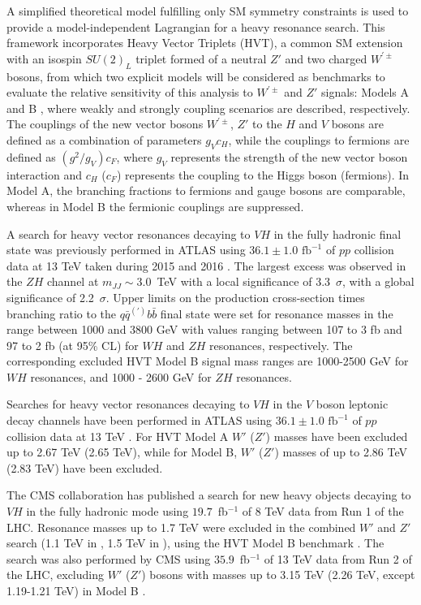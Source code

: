 A simplified theoretical model \cite{Pappadopulo:2014qza} fulfilling only SM symmetry constraints is used to provide a model-independent Lagrangian for a heavy resonance search.
This framework incorporates Heavy Vector Triplets (HVT), a common SM extension with an isospin $SU(2)_{L}$ triplet formed of a neutral $Z'$ and two charged $W^{\prime \pm}$ bosons, from which two explicit models will be considered as benchmarks to evaluate the relative sensitivity of this analysis to $W^{\prime \pm}$ and $Z'$ signals: Models A and B \cite{Pappadopulo:2014qza}, where weakly and strongly coupling scenarios are described, respectively.
The couplings of the new vector bosons $W^{\prime \pm}$, $Z'$ to the $H$ and $V$ bosons are defined as a combination of parameters $g_{V}c_{H}$, while the couplings to fermions are defined as $(g^{2}/g_{V})c_{F}$, where $g_V$ represents the strength of the new vector boson interaction and $c_{H}$ ($c_{F}$) represents the coupling to the Higgs boson (fermions).
In Model A, the branching fractions to fermions and gauge bosons are comparable, whereas in Model B the fermionic couplings are suppressed.

A search for heavy vector resonances decaying to $VH$ in the fully hadronic final state was previously performed in ATLAS using $36.1\pm1.0\text{~fb}^{-1}$ of $pp$ collision data at 13 TeV taken during 2015 and 2016 \cite{Aaboud:2017ahz}.
The largest excess was observed in the $ZH$ channel at $m_{JJ}\sim3.0$~TeV with a local significance of 3.3~$\sigma$, with a  global significance of  2.2~$\sigma$.
Upper limits on the production cross-section times branching ratio to the $q\bar{q}^{(\prime)}b\bar{b}$ final state were set for resonance masses in the range between 1000 and 3800 GeV with values ranging between 107 to 3 fb and 97 to 2 fb (at 95\% CL) for $WH$ and $ZH$ resonances, respectively.
The corresponding excluded HVT Model B signal mass ranges are 1000-2500 GeV for $WH$ resonances, and 1000 - 2600 GeV for $ZH$ resonances.

Searches for heavy vector resonances decaying to $VH$ in the $V$ boson leptonic decay channels have been performed in ATLAS using $36.1\pm1.0\text{~fb}^{-1}$ of $pp$ collision data at 13 TeV \cite{EXOT-2016-10}.
For HVT Model A $W'$ ($Z'$) masses have been excluded up to 2.67 TeV (2.65 TeV), while for Model B, $W'$ ($Z'$) masses of up to 2.86 TeV (2.83 TeV) have been excluded.

The CMS collaboration has published a search for new heavy objects decaying to $VH$ in the fully hadronic mode using $19.7$~fb$^{-1}$ of 8 TeV data from Run 1 of the LHC.
Resonance masses up to 1.7 TeV were excluded in the combined $W'$ and $Z'$ search (1.1 TeV in \zpzh, 1.5 TeV in \wpwh), using the HVT Model B benchmark \cite{Khachatryan:2015bma}.
The search was also performed by CMS using $35.9$~fb$^{-1}$ of 13 TeV data from Run 2 of the LHC, excluding $W'$ ($Z'$) bosons with masses up to 3.15 TeV (2.26 TeV, except 1.19-1.21 TeV) in Model B \cite{Sirunyan:2017wto}.

